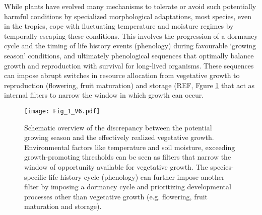 \documentclass{article}
\begin{document}
		While plants have evolved many mechanisms to tolerate or avoid such potentially harmful conditions by specialized morphological adaptations, most species, even in the tropics, cope with fluctuating temperature and moisture regimes by temporally escaping these conditions. This involves the progression of a dormancy cycle and the timing of life history events (phenology) during favourable `growing season' conditions, and ultimately phenological sequences that optimally balance growth and reproduction with survival for long-lived organisms. These sequences can impose abrupt switches in resource allocation from vegetative growth to reproduction (flowering, fruit maturation) and storage (REF, Fgure \ref{fig:fig_1xxx} that act as internal filters to narrow the window in which growth can occur.\\
		
		
		
								\begin{figure}
								\centering
								\texttt{[image: Fig\_1\_V6.pdf]} 
								\caption{Schematic overview of the discrepancy between the potential growing season and the effectively realized vegetative growth. Environmental factors like temperature and soil moisture, exceeding growth-promoting thresholds can be seen as filters that narrow the window of opportunity available for vegetative growth. The species-specific life history cycle (phenology) can further impose another filter by imposing a dormancy cycle and prioritizing developmental processes other than vegetative growth (e.g. flowering, fruit maturation and storage). }
								\label{fig:fig_1xxx}
							\end{figure}
\end{document}
